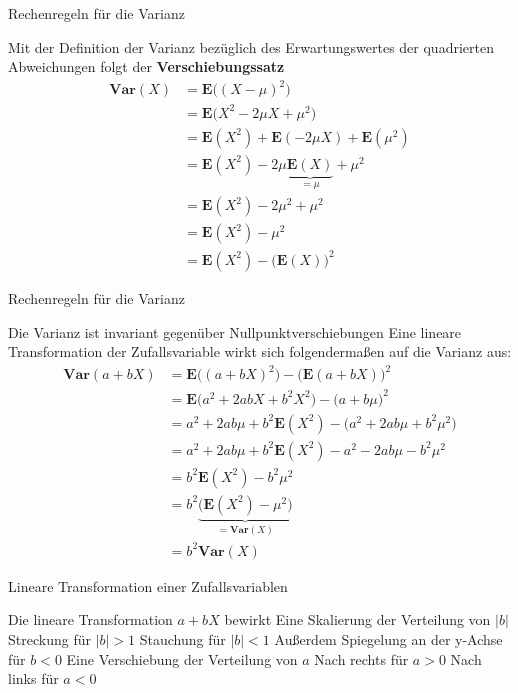 \documentclass[mathserif]{beamer}
\begin{document}
\begin{frame}{Rechenregeln für die Varianz}
    \begin{outline}
        \1 Mit der Definition der Varianz bezüglich des Erwartungswertes der quadrierten Abweichungen folgt der \textbf{Verschiebungssatz}\begin{align*}
            \mathbf{Var}(X)&=\mathbf{E}\Big((X-\mu)^2\Big)\\
            &=\mathbf{E}\Big(X^2-2\mu X+\mu^2\Big)\\
            &=\mathbf{E}(X^2)+\mathbf{E}(-2\mu X)+\mathbf{E}(\mu^2)\\
            &=\mathbf{E}(X^2)-2\mu\underbrace{\mathbf{E}(X)}_{=\mu}+\mu^2\\
            &=\mathbf{E}(X^2)-2\mu^2+\mu^2\\
            &=\mathbf{E}(X^2)-\mu^2\\
            &=\mathbf{E}(X^2)-\Big(\mathbf{E}(X)\Big)^2
        \end{align*}
    \end{outline}
\end{frame}
\begin{frame}{Rechenregeln für die Varianz}
    \begin{outline}
        \1 Die Varianz ist invariant gegenüber Nullpunktverschiebungen
        \1 Eine lineare Transformation der Zufallsvariable wirkt sich folgendermaßen auf die Varianz aus:\begin{align*}
            \mathbf{Var}(a+bX)&=\mathbf{E}\Big((a+bX)^2\Big)-\Big(\mathbf{E}(a+bX)\Big)^2\\
            &=\mathbf{E}\Big(a^2+2abX+b^2X^2\Big)-\Big(a+b\mu\Big)^2\\
            &=a^2+2ab\mu+b^2\mathbf{E}(X^2)-\Big(a^2+2ab\mu+b^2\mu^2\Big)\\
            &=a^2+2ab\mu+b^2\mathbf{E}(X^2)-a^2-2ab\mu-b^2\mu^2\\
            &=b^2\mathbf{E}(X^2)-b^2\mu^2\\
            &=b^2\underbrace{\Big(\mathbf{E}(X^2)-\mu^2\Big)}_{=\mathbf{Var}(X)}\\
            &=b^2\mathbf{Var}(X)
        \end{align*}
    \end{outline}
\end{frame}
\begin{frame}{Lineare Transformation einer Zufallsvariablen}
    \begin{outline}
        \1 Die lineare Transformation $a+bX$ bewirkt
        \2 Eine Skalierung der Verteilung von $|b|$
        \3 Streckung für $|b|>1$
        \3 Stauchung für $|b|<1$
        \3 Außerdem Spiegelung an der y-Achse für $b<0$
        \2 Eine Verschiebung der Verteilung von $a$
        \3 Nach rechts für $a>0$
        \3 Nach links für $a<0$
    \end{outline}
\end{frame}
\end{document}
